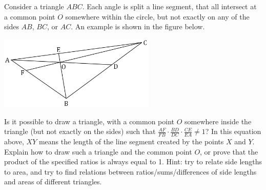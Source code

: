 \item[6] Consider a triangle $ABC$. Each angle is split a line segment, that all intersect at a common point $O$ somewhere within the circle, but not exactly on any of the sides $AB$, $BC$, or $AC$. An example is shown in the figure below.

\includegraphics[height=3.5cm]{images/triangle.png}

Is it possible to draw a triangle, with a common point $O$ somewhere inside the triangle (but not exactly on the sides) such that $\frac{AF}{FB}\cdot \frac{BD}{DC} \cdot \frac{CE}{EA} \neq 1$? In this equation above, $XY$ means the length of the line segment created by the points $X$ and $Y$. Explain how to draw such a triangle and the common point $O$, or prove that the product of the specified ratios is always equal to 1. Hint: try to relate side lengths to area, and try to find relations between ratios/sums/differences of side lengths and areas of different triangles.
